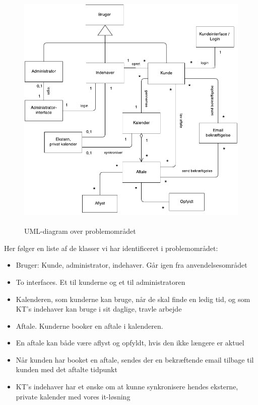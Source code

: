 \documentclass[12pt]{article}
\begin{document}
\begin{figure}[!ht]
\includegraphics[width=12cm, height=12cm]{problemomr.pdf}
\caption{UML-diagram over problemområdet}
\label{fig:problem}
\end{figure}

Her følger en liste af de klasser vi har identificeret i problemområdet:

\begin{itemize}
\item Bruger: Kunde, administrator, indehaver. Går igen fra
	anvendelsesområdet
\item To interfaces. Et til kunderne og et til administratoren
\item Kalenderen, som kunderne kan bruge, når de skal finde en ledig tid, og
	som KT's indehaver kan bruge i sit daglige, travle arbejde
\item Aftale. Kunderne booker en aftale i kalenderen.
\item En aftale kan både være aflyst og opfyldt, hvis den ikke længere er
	aktuel
\item Når kunden har booket en aftale, sendes der en bekræftende email tilbage
	til kunden med det aftalte tidpunkt
\item KT's indehaver har et ønske om at kunne synkronisere hendes eksterne,
	private kalender med vores it-løsning
\end{itemize}
\end{document}
